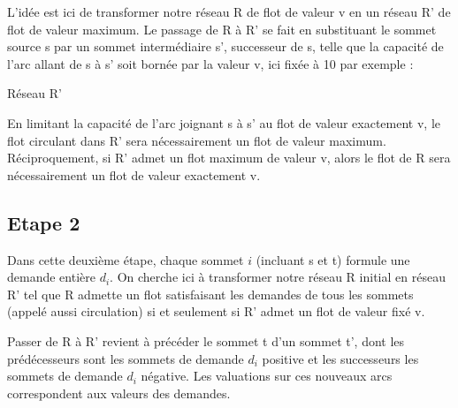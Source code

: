 \documentclass[letterpaper,12pt]{article}
\begin{document}
L'idée est ici de transformer notre réseau R de flot de valeur v en un réseau R' de flot de valeur maximum.
Le passage de R à R' se fait en substituant le sommet source s par un sommet intermédiaire s', successeur de s, telle que la capacité de l'arc allant de s à s' soit bornée par la valeur v, ici fixée à 10 par exemple :
\hfill \break

\begin{center}

Réseau R'

\end{center}
\hfill \break
En limitant la capacité de l'arc joignant s à s' au flot de valeur exactement v, le flot circulant dans R' sera nécessairement un flot de valeur maximum. Réciproquement, si R' admet un flot maximum de valeur v, alors le flot de R sera nécessairement un flot de valeur exactement v.

\subsection{Etape 2}

Dans cette deuxième étape, chaque sommet $i$ (incluant s et t) formule une demande entière $d_i$.
On cherche ici à transformer notre réseau R initial en réseau R' tel que R admette un flot satisfaisant les demandes de tous les sommets (appelé aussi circulation) si et seulement si R' admet un flot de valeur fixé v.

Passer de R à R' revient à précéder le sommet t d'un sommet t', dont les prédécesseurs sont les sommets de demande $d_i$ positive et les successeurs les sommets de demande $d_i$ négative. Les valuations sur ces nouveaux arcs correspondent aux valeurs des demandes.
\end{document}
